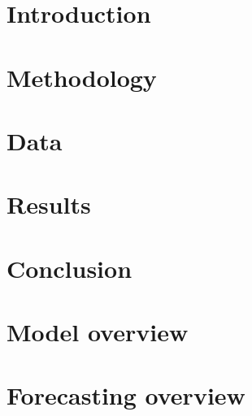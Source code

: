 \documentclass[a4paper,11pt]{report}
\begin{document}


\tableofcontents
\newpage

\chapter{Introduction}
\label{chap:introduction}


\chapter{Methodology}
\label{chap:methodology}


\chapter{Data}
\label{chap:data}


\chapter{Results}
\label{chap:results}


\chapter{Conclusion}
\label{chap:conclusion}


\appendix
\chapter{Model overview}
\label{chap:model-overview}


\chapter{Forecasting overview}
\label{chap:forecasting-overview}


\printbibliography
\end{document}
